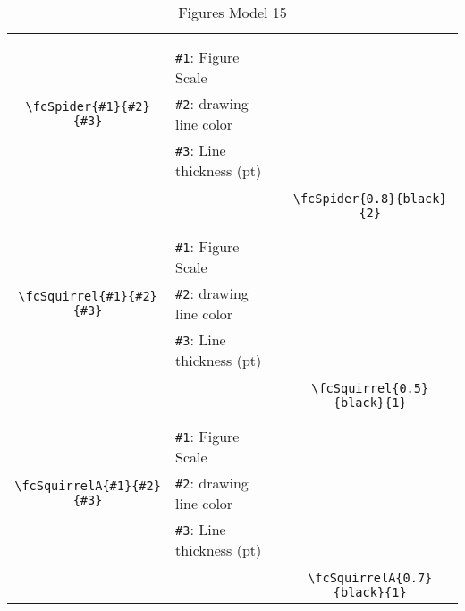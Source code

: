 \documentclass[x11names]{article}
\begin{document}
\begin{table}[H]
\begin{tabular}{|c|l|c|}
	&&\multirow{5}{*}{\fcSpider{0.8}{black}{2}}\\	&&\\	&\verb|#1|: Figure Scale &\\	\verb|\fcSpider{#1}{#2}{#3}|&	\verb|#2|: drawing line color &\\	&\verb|#3|: Line thickness (pt) &\\ &&\\&&	\verb|\fcSpider{0.8}{black}{2}|\\\hline 	
	&&\multirow{5}{*}{\fcSquirrel{0.5}{black}{1}}\\	&&\\	&\verb|#1|: Figure Scale &\\	\verb|\fcSquirrel{#1}{#2}{#3}|&	\verb|#2|: drawing line color &\\	&\verb|#3|: Line thickness (pt) &\\ &&\\&&	\verb|\fcSquirrel{0.5}{black}{1}|\\\hline 	
	&&\multirow{5}{*}{\fcSquirrelA{0.7}{black}{1}}\\	&&\\	&\verb|#1|: Figure Scale &\\	\verb|\fcSquirrelA{#1}{#2}{#3}|&	\verb|#2|: drawing line color &\\	&\verb|#3|: Line thickness (pt) &\\ &&\\&&	\verb|\fcSquirrelA{0.7}{black}{1}|\\\hline 	\hline\end{tabular}\caption{Figures Model 15}\label{tab15}\end{table}
\end{document}
